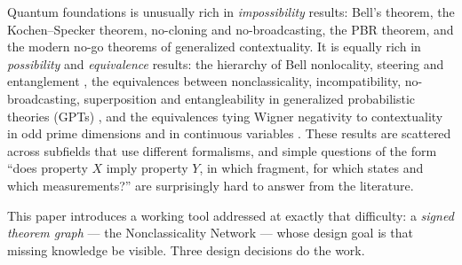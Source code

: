 \documentclass[11pt,a4paper]{article}
\theoremstyle{definition}
\begin{document}
Quantum foundations is unusually rich in \emph{impossibility} results: Bell's
theorem, the Kochen--Specker theorem, no-cloning and no-broadcasting, the PBR
theorem, and the modern no-go theorems of generalized contextuality. It is
equally rich in \emph{possibility} and \emph{equivalence} results: the
hierarchy of Bell nonlocality, steering and entanglement
\cite{wiseman2007}, the equivalences between nonclassicality, incompatibility,
no-broadcasting, superposition and entangleability in generalized
probabilistic theories (GPTs)
\cite{plavala2016,barnum2007,aubrun2021,aubrun2022}, and the equivalences
tying Wigner negativity to contextuality in odd prime dimensions
\cite{howard2014} and in continuous variables \cite{booth2022}. These results
are scattered across subfields that use different formalisms, and simple
questions of the form ``does property $X$ imply property $Y$, in which
fragment, for which states and which measurements?'' are surprisingly hard
to answer from the literature.

This paper introduces a working tool addressed at exactly that difficulty: a
\emph{signed theorem graph} --- the Nonclassicality Network --- whose design
goal is that missing knowledge be visible. Three design decisions do the work.
\end{document}
